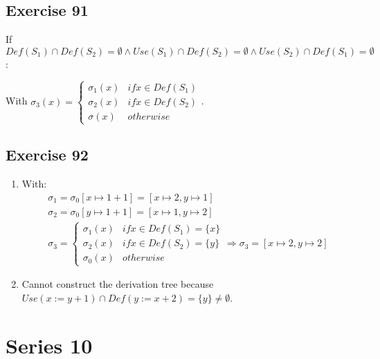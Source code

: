 \documentclass[12pt,fleqn]{article}		%
\begin{document}
\subsection{Exercise 91}
If $ Def(S_1) \cap Def(S_2) = \emptyset \land Use(S_1) \cap Def(S_2) = \emptyset \land Use(S_2) \cap Def(S_1) = \emptyset $:
\begin{prooftree}
\end{prooftree}
With $ \sigma_3(x) = 
\begin{cases}
\sigma_1(x) & if x \in Def(S_1)\\
\sigma_2(x) & if x \in Def(S_2)\\
\sigma(x) & otherwise
\end{cases} $.

\subsection{Exercise 92}
\begin{enumerate}
\item 
\begin{prooftree}
\end{prooftree}
With:
\begin{align*}
\sigma_1 = \sigma_0[x \mapsto 1 + 1] = [x \mapsto 2, y \mapsto 1]\\
\sigma_2 = \sigma_0[y \mapsto 1 + 1] = [x \mapsto 1, y \mapsto 2]\\
\sigma_3 = \begin{cases}
\sigma_1(x) & if x \in Def(S_1)=\{x\}\\
\sigma_2(x) & if x \in Def(S_2)=\{y\}\\
\sigma_0(x) & otherwise
\end{cases}
\Rightarrow
\sigma_3 = [x \mapsto 2, y \mapsto 2]
\end{align*}

\item Cannot construct the derivation tree because $ Use(x:=y+1) \cap Def(y:=x+2) = \{y\} \not= \emptyset$.
\end{enumerate}

\section{Series 10}
\end{document}
